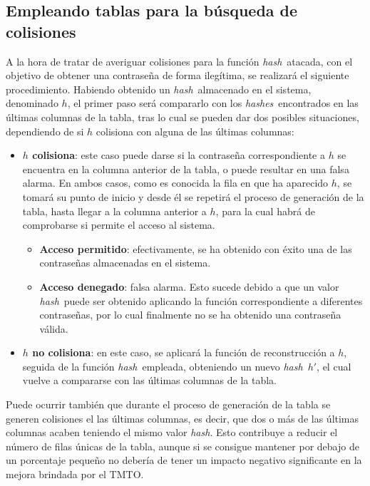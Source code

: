 \documentclass[12pt,spanish,listoffigures,listoftables]{tfgetsinf}
\newcommand{\hash}{\textit{hash}}
\newcommand{\hashes}{\textit{hashes}}
\begin{document}
\subsection{Empleando tablas para la búsqueda de colisiones}

A la hora de tratar de averiguar colisiones para la función \hash~atacada, con el objetivo de obtener una contraseña de forma ilegítima, se realizará el siguiente procedimiento. Habiendo obtenido un \hash~almacenado en el sistema, denominado $h$, el primer paso será compararlo con los \hashes~encontrados en las últimas columnas de la tabla, tras lo cual se pueden dar dos posibles situaciones, dependiendo de si $h$ colisiona con alguna de las últimas columnas:

\begin{itemize}

    \item \textbf{$h$ colisiona}: este caso puede darse si la contraseña correspondiente a $h$ se encuentra en la columna anterior de la tabla, o puede resultar en una falsa alarma. En ambos casos, como es conocida la fila en que ha aparecido $h$, se tomará su punto de inicio y desde él se repetirá el proceso de generación de la tabla, hasta llegar a la columna anterior a $h$, para la cual habrá de comprobarse si permite el acceso al sistema.
    \begin{itemize}
    
        \item \textbf{Acceso permitido}: efectivamente, se ha obtenido con éxito una de las contraseñas almacenadas en el sistema.
        
        \item \textbf{Acceso denegado}: falsa alarma. Esto sucede debido a que un valor \hash~puede ser obtenido aplicando la función correspondiente a diferentes contraseñas, por lo cual finalmente no se ha obtenido una contraseña válida.
        
    \end{itemize}

    \item \textbf{$h$ no colisiona}: en este caso, se aplicará la función de reconstrucción a $h$, seguida de la función \hash~empleada, obteniendo un nuevo \hash~$h'$, el cual vuelve a compararse con las últimas columnas de la tabla.
    
\end{itemize}

Puede ocurrir también que durante el proceso de generación de la tabla se generen colisiones el las últimas columnas, es decir, que dos o más de las últimas columnas acaben teniendo el mismo valor \hash. Esto contribuye a reducir el número de filas únicas de la tabla, aunque si se consigue mantener por debajo de un porcentaje pequeño no debería de tener un impacto negativo significante en la mejora brindada por el TMTO.
\end{document}
